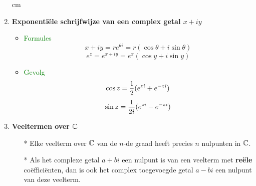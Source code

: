 \begin{enumerate}
\begin{itemize}
\end{itemize} cm
\item \hypertarget{exponentiele_vorm}{{\bf Exponenti\"ele schrijfwijze van een complex getal $x+iy$}}\label{exponentiele_vorm}
\begin{itemize}%
\item \textcolor{green}{Formules}
\[x+iy=r e^{\theta i}=r(\cos\theta+i\sin\theta)\]
\[e^z=e^{x+iy}=e^x(\cos y+i\sin y)\]
\item \textcolor{green}{Gevolg}
\[\cos z =\displaystyle\frac{\displaystyle 1}{\displaystyle 2}(e^{zi}+e^{-zi})\]
\[\sin z =\displaystyle\frac{\displaystyle 1}{\displaystyle 2i}(e^{zi}-e^{-zi})\]
\end{itemize}%
\item \hypertarget{veeltermen_over_C}{{\bf Veeltermen over $\mathbb{C}$}}\label{veeltermen_over_C}
\begin{itemize}%
\item[*] Elke veelterm over $\mathbb{C}$ van de $n$-de graad heeft precies $n$ nulpunten in $\mathbb{C}$.
\item[*] Als het complexe getal $a+bi$ een nulpunt is van een veelterm met {\bf re\"ele} co\"effici\"enten, dan is ook het complex toegevoegde getal $a-bi$ een nulpunt van deze veelterm.
\end{itemize} %
\end{enumerate}%

